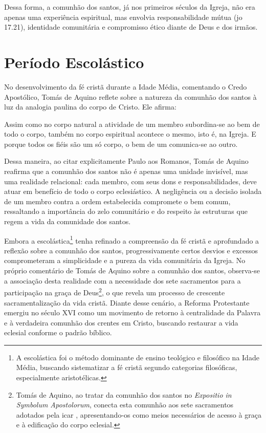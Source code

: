 Dessa forma, a comunhão dos santos, já nos primeiros séculos da Igreja, não era apenas uma experiência espiritual, mas envolvia responsabilidade mútua (\gls{jo} 17.21), identidade comunitária e compromisso ético diante de Deus e dos irmãos.

\section{Período Escolástico}

No desenvolvimento da fé cristã durante a Idade Média, comentando o Credo Apostólico, Tomás de Aquino reflete sobre a natureza da comunhão dos santos à luz da analogia paulina do corpo de Cristo. Ele afirma:
\begin{citacao}
Assim como no corpo natural a atividade de um membro subordina-se ao bem de todo o corpo, também no corpo espiritual acontece o mesmo, isto é, na Igreja. E porque todos os fiéis são um só corpo, o bem de um comunica-se ao outro. \cite[p.~79]{aquinoCredo2004}
\end{citacao}

Dessa maneira, ao citar explicitamente Paulo aos Romanos, Tomás de Aquino reafirma que a comunhão dos santos não é apenas uma unidade invisível, mas uma realidade relacional: cada membro, com seus dons e responsabilidades, deve atuar em benefício de todo o corpo eclesiástico. A negligência ou a decisão isolada de um membro contra a ordem estabelecida compromete o bem comum, ressaltando a importância do zelo comunitário e do respeito às estruturas que regem a vida da comunidade dos santos.

Embora a escolástica\footnote{A escolástica foi o método dominante de ensino teológico e filosófico na Idade Média, buscando sistematizar a fé cristã segundo categorias filosóficas, especialmente aristotélicas.} tenha refinado a compreensão da fé cristã e aprofundado a reflexão sobre a comunhão dos santos, progressivamente certos desvios e excessos comprometeram a simplicidade e a pureza da vida comunitária da Igreja. No próprio comentário de Tomás de Aquino sobre a comunhão dos santos, observa-se a associação desta realidade com a necessidade dos sete sacramentos para a participação na graça de Deus\footnote{Tomás de Aquino, ao tratar da comunhão dos santos no \textit{\foreignlanguage{latin}{Expositio in Symbolum Apostolorum}}, conecta esta comunhão aos sete sacramentos adotados pela \gls{icar} \cite{aquinoCredo2004}, apresentando-os como meios necessários de acesso à graça e à edificação do corpo eclesial.}, o que revela um processo de crescente sacramentalização da vida cristã. Diante desse cenário, a Reforma Protestante emergiu no século XVI como um movimento de retorno à centralidade da Palavra e à verdadeira comunhão dos crentes em Cristo, buscando restaurar a vida eclesial conforme o padrão bíblico.

